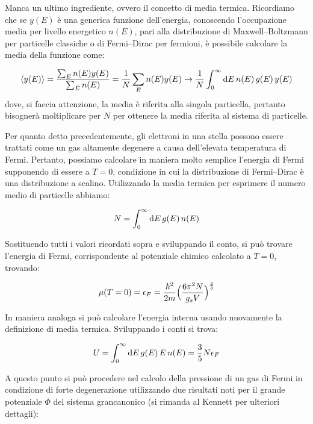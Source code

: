 Manca un ultimo ingrediente, ovvero il concetto di media termica. Ricordiamo che se $y(E)$ è una generica funzione dell'energia, conoscendo l'occupazione media per livello energetico $n(E)$, pari alla distribuzione di Maxwell--Boltzmann per particelle classiche o di Fermi--Dirac per fermioni, è possibile calcolare la media della funzione come:

\begin{equation}
    \langle y(E) \rangle = \dfrac{\sum_{E} n(E) y(E)}{\sum_E n(E)} = \frac{1}{N} \sum_{E} n(E) y(E) \to \frac{1}{N} \int_{0}^\infty \mathop{\mathrm{{}d}}\mathopen{} E \, n(E) \, g(E) \, y(E)
\end{equation}
dove, si faccia attenzione, la media è riferita alla singola particella, pertanto bisognerà moltiplicare per $N$ per ottenere la media riferita al sistema di particelle.

Per quanto detto precedentemente, gli elettroni in una stella possono essere trattati come un gas altamente degenere a causa dell'elevata temperatura di Fermi. Pertanto, possiamo calcolare in maniera molto semplice l'energia di Fermi supponendo di essere a $T=0$, condizione in cui la distribuzione di Fermi--Dirac è una distribuzione a scalino. Utilizzando la media termica per esprimere il numero medio di particelle abbiamo:

\[
N = \int_{0}^\infty \mathop{\mathrm{{}d}}\mathopen{} E \, g(E) \, n(E)
\]

Sostituendo tutti i valori ricordati sopra e sviluppando il conto, si può trovare l'energia di Fermi, corrispondente al potenziale chimico calcolato a $T=0$, trovando:

\begin{equation}\label{eq:energia-di-fermi}
    \mu(T=0) = \epsilon_F = \dfrac{\hslash^2}{2m} \Bigl( \dfrac{6 {\pi}^2 N}{g_s V} \Bigr) ^ \frac{2}{3}
 \end{equation}

 In maniera analoga si può calcolare l'energia interna usando nuovamente la definizione di media termica. Sviluppando i conti si trova:

 \begin{equation}\label{eq:energia-interna-di-fermi}
    U = \int_0^\infty \mathop{\mathrm{{}d}}\mathopen{} E \, g(E) \, E \, n(E) = \frac{3}{5} N \epsilon_F
 \end{equation}

 A questo punto si può procedere nel calcolo della pressione di un gas di Fermi in condizione di forte degenerazione utilizzando due risultati noti per il grande potenziale $\Phi$ del sistema grancanonico (si rimanda al Kennett per ulteriori dettagli):

